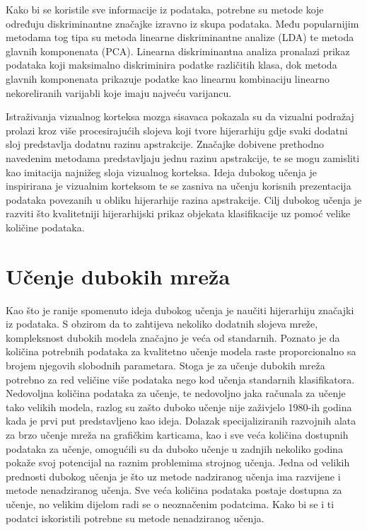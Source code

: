 \documentclass[lmodern, utf8, diplomski, numeric]{fer}
\begin{document}
Kako bi se koristile sve informacije iz podataka, potrebne su metode koje određuju diskriminantne značajke izravno iz skupa podataka. Među popularnijim metodama tog tipa su metoda linearne diskriminantne analize (LDA) te metoda glavnih komponenata (PCA). Linearna diskriminantna analiza pronalazi prikaz podataka koji maksimalno diskriminira podatke različitih klasa, dok metoda glavnih komponenata prikazuje podatke kao linearnu kombinaciju linearno nekoreliranih varijabli koje imaju najveću varijancu.

Istraživanja vizualnog korteksa mozga sisavaca pokazala su da vizualni podražaj prolazi kroz više procesirajućih slojeva koji tvore hijerarhiju gdje svaki dodatni sloj predstavlja dodatnu razinu apstrakcije.  Značajke dobivene prethodno navedenim metodama predstavljaju jednu razinu apstrakcije, te se mogu zamisliti kao imitacija najnižeg sloja vizualnog korteksa. Ideja dubokog učenja je  inspirirana je vizualnim korteksom te se zasniva na učenju korisnih prezentacija podataka povezanih u obliku hijerarhije razina apstrakcije. Cilj dubokog učenja je razviti što kvalitetniji hijerarhijski prikaz objekata klasifikacije uz pomoć velike količine podataka.

\section{Učenje dubokih mreža}

Kao što je ranije spomenuto ideja dubokog učenja je naučiti hijerarhiju značajki iz podataka. S obzirom da to zahtijeva nekoliko dodatnih slojeva mreže, kompleksnost dubokih modela značajno je veća od standarnih. Poznato je da količina potrebnih podataka za kvalitetno učenje modela raste proporcionalno sa brojem njegovih slobodnih parametara. Stoga je za učenje dubokih mreža potrebno za red veličine više podataka nego kod učenja standarnih klasifikatora. Nedovoljna količina podataka za učenje, te nedovoljno jaka računala za učenje tako velikih modela, razlog su zašto duboko učenje nije zaživjelo 1980-ih godina kada je prvi put predstavljeno kao ideja. Dolazak specijaliziranih razvojnih alata za brzo učenje mreža na grafičkim karticama, kao i sve veća količina dostupnih podataka za učenje, omogućili su da duboko učenje u zadnjih nekoliko godina pokaže svoj potencijal na raznim problemima strojnog učenja.
Jedna od velikih prednosti dubokog učenja je što uz metode nadziranog učenja ima razvijene i metode nenadziranog učenja. Sve veća količina podataka postaje dostupna za učenje, no velikim dijelom radi se o neoznačenim podatcima. Kako bi se i ti podatci iskoristili potrebne su metode nenadziranog učenja.
\end{document}
